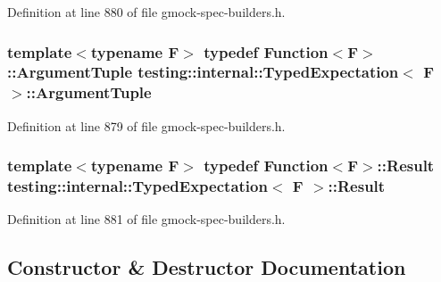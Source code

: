 Definition at line 880 of file gmock-\/spec-\/builders.\+h.

\subsubsection[{\texorpdfstring{Argument\+Tuple}{ArgumentTuple}}]{\setlength{\rightskip}{0pt plus 5cm}template$<$typename F$>$ typedef {\bf Function}$<$F$>$\+::{\bf Argument\+Tuple} {\bf testing\+::internal\+::\+Typed\+Expectation}$<$ F $>$\+::{\bf Argument\+Tuple}}\hypertarget{classtesting_1_1internal_1_1_typed_expectation_a9a91379262d101f435809ba4556d14fa}{}\label{classtesting_1_1internal_1_1_typed_expectation_a9a91379262d101f435809ba4556d14fa}


Definition at line 879 of file gmock-\/spec-\/builders.\+h.

\subsubsection[{\texorpdfstring{Result}{Result}}]{\setlength{\rightskip}{0pt plus 5cm}template$<$typename F$>$ typedef {\bf Function}$<$F$>$\+::{\bf Result} {\bf testing\+::internal\+::\+Typed\+Expectation}$<$ F $>$\+::{\bf Result}}\hypertarget{classtesting_1_1internal_1_1_typed_expectation_a6503597ee9d5ec940bfe8e51832b2422}{}\label{classtesting_1_1internal_1_1_typed_expectation_a6503597ee9d5ec940bfe8e51832b2422}


Definition at line 881 of file gmock-\/spec-\/builders.\+h.



\subsection{Constructor \& Destructor Documentation}
